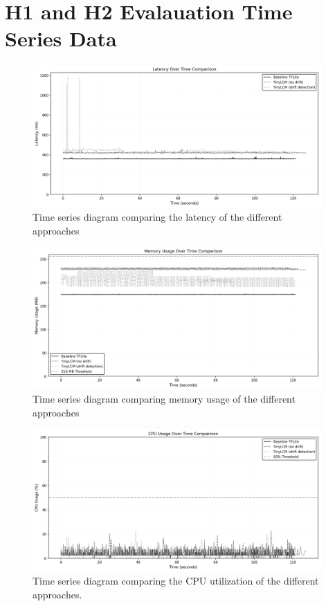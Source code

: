 \section{H1 and H2 Evalauation Time Series Data}
\label{app:eval-data}

\begin{figure}[htbp]
    \centering
    \includegraphics[width=0.98\textwidth]{figs/evaluation/latency_timeseries.png}
    \caption[Latency Comparison]{Time series diagram comparing the latency of the different approaches}
    \label{fig:latency-comparison}
\end{figure}

\begin{figure}[htbp]
    \centering
    \includegraphics[width=0.98\textwidth]{figs/evaluation/memory_timeseries.png}
    \caption[Memory Comparison]{Time series diagram comparing memory usage of the different approaches}
    \label{fig:memory-comparison}
\end{figure}

\begin{figure}[htbp]
    \centering
    \includegraphics[width=0.98\textwidth]{figs/evaluation/cpu_timeseries.png}
    \caption[CPU Comparison]{Time series diagram comparing the CPU utilization of the different approaches.}
    \label{fig:cpu-comparison}
\end{figure}
